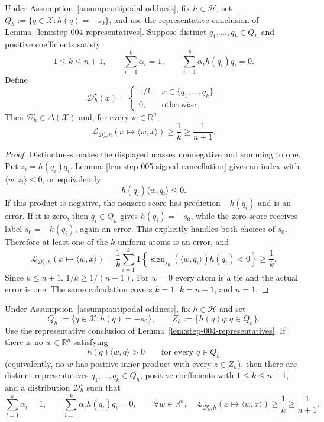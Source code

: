 \begin{proposition}
\label{prop:step-005-uniform-obstruction}
Under Assumption~\ref{assump:antipodal-oddness}, fix $h\in\mathcal H$, set
$Q_h:=\{q\in\mathcal X:h(q)=-s_0\}$, and use the representative conclusion
of Lemma~\ref{lem:step-004-representatives}.  Suppose distinct
$q_1,\ldots,q_k\in Q_h$ and positive coefficients satisfy
\[
1\leq k\leq n+1,\qquad \sum_{i=1}^k\alpha_i=1,\qquad
\sum_{i=1}^k\alpha_i h(q_i)q_i=0.
\]
Define
\[
\mathcal D_h^\star(x)=
\begin{cases}
1/k,&x\in\{q_1,\ldots,q_k\},\\
0,&\text{otherwise}.
\end{cases}
\]
Then $\mathcal D_h^\star\in\Delta(\mathcal X)$ and, for every
$w\in\mathbb R^n$,
\[
\mathcal L_{\mathcal D_h^\star,h}(x\mapsto\langle w,x\rangle)
\geq\frac1k\geq\frac1{n+1}.
\]
\end{proposition}

\begin{proof}
Distinctness makes the displayed masses nonnegative and summing to one.  Put
$z_i=h(q_i)q_i$.  Lemma~\ref{lem:step-005-signed-cancellation} gives an
index with $\langle w,z_i\rangle\leq0$, or equivalently
\[
h(q_i)\langle w,q_i\rangle\leq0.
\]
If this product is negative, the nonzero score has prediction $-h(q_i)$ and
is an error.  If it is zero, then $q_i\in Q_h$ gives
$h(q_i)=-s_0$, while the zero score receives label $s_0=-h(q_i)$, again an
error.  This explicitly handles both choices of $s_0$.
Therefore at least one of the $k$ uniform atoms is an error, and
\[
\mathcal L_{\mathcal D_h^\star,h}(x\mapsto\langle w,x\rangle)
=\frac1k\sum_{i=1}^k
\mathbf 1\!\left\{
\operatorname{sign}_{s_0}(\langle w,q_i\rangle)h(q_i)<0
\right\}
\geq\frac1k.
\]
Since $k\leq n+1$, $1/k\geq1/(n+1)$.  For $w=0$ every atom is a tie and
the actual error is one.  The same calculation covers $k=1$, $k=n+1$, and
$n=1$.
\end{proof}

\begin{proposition}
\label{prop:step-005-obstruction}
Under Assumption~\ref{assump:antipodal-oddness}, fix $h\in\mathcal H$ and set
\[
Q_h:=\{q\in\mathcal X:h(q)=-s_0\},\qquad
Z_h:=\{h(q)q:q\in Q_h\}.
\]
Use the representative conclusion of
Lemma~\ref{lem:step-004-representatives}.  If there is no
$w\in\mathbb R^n$ satisfying
\[
h(q)\langle w,q\rangle>0\qquad\text{for every }q\in Q_h
\]
(equivalently, no $w$ has positive inner product with every $z\in Z_h$),
then there are distinct representatives
$q_1,\ldots,q_k\in Q_h$, positive coefficients with $1\leq k\leq n+1$,
and a distribution $\mathcal D_h^\star$ such that
\[
\sum_{i=1}^k\alpha_i=1,\qquad
\sum_{i=1}^k\alpha_i h(q_i)q_i=0,
\qquad
\forall w\in\mathbb R^n,\quad
\mathcal L_{\mathcal D_h^\star,h}(x\mapsto\langle w,x\rangle)
\geq\frac1k\geq\frac1{n+1}.
\]
\end{proposition}

